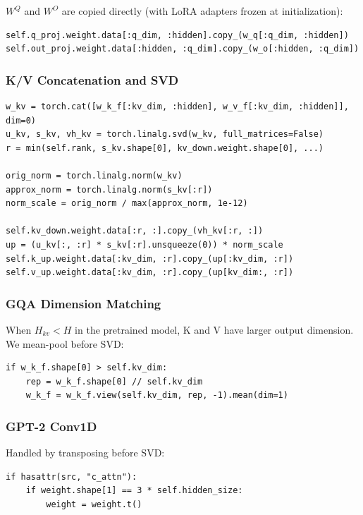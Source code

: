 $W^Q$ and $W^O$ are copied directly (with LoRA adapters frozen at 
initialization):

\begin{lstlisting}
self.q_proj.weight.data[:q_dim, :hidden].copy_(w_q[:q_dim, :hidden])
self.out_proj.weight.data[:hidden, :q_dim].copy_(w_o[:hidden, :q_dim])
\end{lstlisting}

\subsubsection{K/V Concatenation and SVD}

\begin{lstlisting}
w_kv = torch.cat([w_k_f[:kv_dim, :hidden], w_v_f[:kv_dim, :hidden]], dim=0)
u_kv, s_kv, vh_kv = torch.linalg.svd(w_kv, full_matrices=False)
r = min(self.rank, s_kv.shape[0], kv_down.weight.shape[0], ...)

orig_norm = torch.linalg.norm(w_kv)
approx_norm = torch.linalg.norm(s_kv[:r])
norm_scale = orig_norm / max(approx_norm, 1e-12)

self.kv_down.weight.data[:r, :].copy_(vh_kv[:r, :])
up = (u_kv[:, :r] * s_kv[:r].unsqueeze(0)) * norm_scale
self.k_up.weight.data[:kv_dim, :r].copy_(up[:kv_dim, :r])
self.v_up.weight.data[:kv_dim, :r].copy_(up[kv_dim:, :r])
\end{lstlisting}

\subsubsection{GQA Dimension Matching}

When $H_{kv} < H$ in the pretrained model, K and V have larger output 
dimension. We mean-pool before SVD:

\begin{lstlisting}
if w_k_f.shape[0] > self.kv_dim:
    rep = w_k_f.shape[0] // self.kv_dim
    w_k_f = w_k_f.view(self.kv_dim, rep, -1).mean(dim=1)
\end{lstlisting}

\subsubsection{GPT-2 Conv1D}

Handled by transposing before SVD:

\begin{lstlisting}
if hasattr(src, "c_attn"):
    if weight.shape[1] == 3 * self.hidden_size:
        weight = weight.t()
\end{lstlisting}

